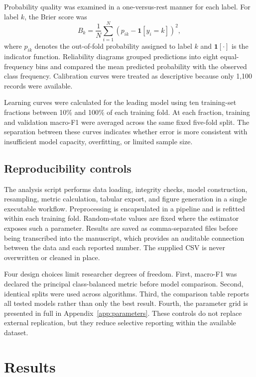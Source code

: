 \documentclass[review]{elsarticle}
\begin{document}
Probability quality was examined in a one-versus-rest manner for each label. For label $k$, the Brier score was
\begin{equation}
B_k=\frac{1}{N}\sum_{i=1}^{N}(p_{ik}-\mathbf{1}[y_i=k])^2,
\end{equation}
where $p_{ik}$ denotes the out-of-fold probability assigned to label $k$ and $\mathbf{1}[\cdot]$ is the indicator function. Reliability diagrams grouped predictions into eight equal-frequency bins and compared the mean predicted probability with the observed class frequency. Calibration curves were treated as descriptive because only 1,100 records were available.

Learning curves were calculated for the leading model using ten training-set fractions between 10\% and 100\% of each training fold. At each fraction, training and validation macro-F1 were averaged across the same fixed five-fold split. The separation between these curves indicates whether error is more consistent with insufficient model capacity, overfitting, or limited sample size.

\subsection{Reproducibility controls}
The analysis script performs data loading, integrity checks, model construction, resampling, metric calculation, tabular export, and figure generation in a single executable workflow. Preprocessing is encapsulated in a pipeline and is refitted within each training fold. Random-state values are fixed where the estimator exposes such a parameter. Results are saved as comma-separated files before being transcribed into the manuscript, which provides an auditable connection between the data and each reported number. The supplied CSV is never overwritten or cleaned in place.

Four design choices limit researcher degrees of freedom. First, macro-F1 was declared the principal class-balanced metric before model comparison. Second, identical splits were used across algorithms. Third, the comparison table reports all tested models rather than only the best result. Fourth, the parameter grid is presented in full in Appendix~\ref{app:parameters}. These controls do not replace external replication, but they reduce selective reporting within the available dataset.

\section{Results}\label{sec:results}
\end{document}
